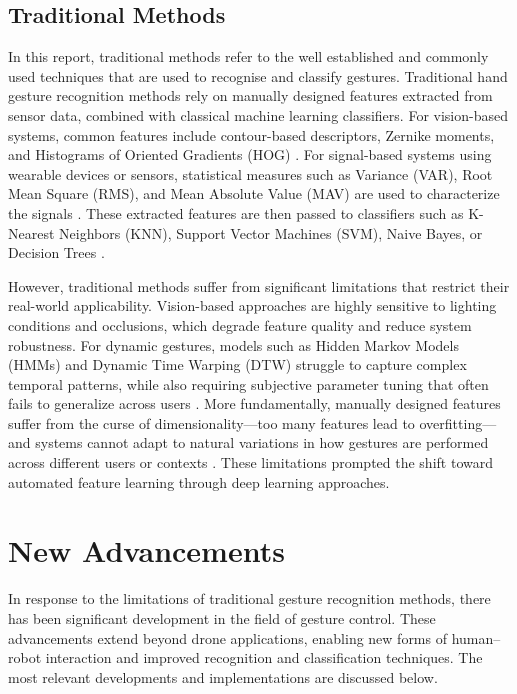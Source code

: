 \subsection{Traditional Methods}
In this report, traditional methods refer to the well established and commonly used techniques that are used to recognise and classify gestures. Traditional hand gesture recognition methods rely on manually designed features extracted from sensor data, combined with classical machine learning classifiers. For vision-based systems, common features include contour-based descriptors, Zernike moments, and Histograms of Oriented Gradients (HOG) \citep{bhushan2022}. For signal-based systems using wearable devices or sensors, statistical measures such as Variance (VAR), Root Mean Square (RMS), and Mean Absolute Value (MAV) are used to characterize the signals \citep{nogales2023}. These extracted features are then passed to classifiers such as K-Nearest Neighbors (KNN), Support Vector Machines (SVM), Naive Bayes, or Decision Trees \citep{bhushan2022}.

However, traditional methods suffer from significant limitations that restrict their real-world applicability. Vision-based approaches are highly sensitive to lighting conditions and occlusions, which degrade feature quality and reduce system robustness. For dynamic gestures, models such as Hidden Markov Models (HMMs) and Dynamic Time Warping (DTW) struggle to capture complex temporal patterns, while also requiring subjective parameter tuning that often fails to generalize across users \citep{jiashan2024}. More fundamentally, manually designed features suffer from the curse of dimensionality—too many features lead to overfitting—and systems cannot adapt to natural variations in how gestures are performed across different users or contexts \citep{jiashan2024}. These limitations prompted the shift toward automated feature learning through deep learning approaches.

\section{New Advancements}
In response to the limitations of traditional gesture recognition methods, there has been significant development in the field of gesture control. These advancements extend beyond drone applications, enabling new forms of human–robot interaction and improved recognition and classification techniques. The most relevant developments and implementations are discussed below. 

